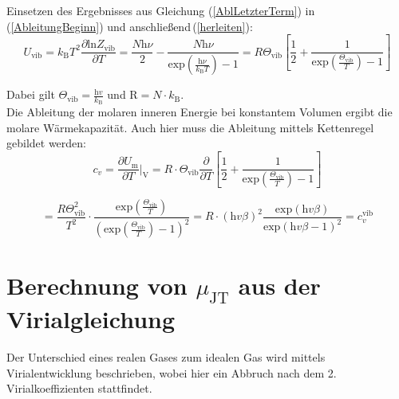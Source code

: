 \documentclass[a4paper,12pt,oneside,onecolum,final,openany]{report}
\begin{document}
Einsetzen des Ergebnisses aus Gleichung (\ref{AblLetzterTerm}) in (\ref{AbleitungBeginn}) und anschließend\,(\ref{herleiten}):\\

\begin{equation}
U_\mathrm{vib}= k_\mathrm{B}T^2 \frac{\partial \mathrm{ln}Z_\mathrm{vib}}{\partial T}=  \frac{N\mathrm{\mathrm{h}}\nu}{2} - \frac{N \mathrm{\mathrm{h}}\nu}{\mathrm{exp}(\frac{\mathrm{\mathrm{h}}\nu}{k_\mathrm{B}T})-1}= R \Theta_\mathrm{vib} \left[ \frac{1}{2} + \frac{1}{\mathrm{exp}(\frac{\Theta_\mathrm{vib}}{T}) -1}\right]
\end{equation}

Dabei gilt $\Theta_\mathrm{vib} = \frac{\mathrm{h}v}{k_\mathrm{B}}$ und $\mathrm{R}=N \cdot k_\mathrm{B}$.\\  


Die Ableitung der molaren inneren Energie bei konstantem Volumen ergibt die molare Wärmekapazität. Auch hier muss die Ableitung mittels Kettenregel gebildet werden:\\


\begin{equation}
c_v = \frac{\partial U_\mathrm{m}}{\partial T}\bigg \vert_\mathrm{V} =R\cdot \Theta_\mathrm{vib} \frac{\partial}{\partial T} \left[\frac{1}{2} + \frac{1}{\mathrm{exp}(\frac{\Theta_\mathrm{vib}}{T})-1} \right]  
\end{equation}


\begin{equation}
= \frac{R\Theta^2_\mathrm{vib}}{T^2} \cdot \frac{\mathrm{exp}(\frac{\Theta_\mathrm{vib}}{T})}{(\mathrm{exp}(\frac{\Theta_\mathrm{vib}}{T})-1)^2}
 = R\cdot(\mathrm{h}v\beta)^2 \frac{\mathrm{exp}(\mathrm{h}v\beta)}{\mathrm{exp}(\mathrm{h}v\beta -1)^2} =c_v^\mathrm{vib}
\end{equation}


\section{Berechnung von $\mu_\mathrm{JT}$ aus der Virialgleichung}

Der Unterschied eines realen Gases zum idealen Gas wird mittels Virialentwicklung beschrieben, wobei hier ein Abbruch nach dem 2. Virialkoeffizienten stattfindet.\\
\end{document}
